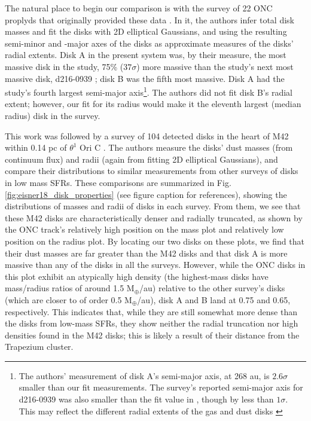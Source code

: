 The natural place to begin our comparison is with the survey of 22 ONC proplyds that originally provided these data \citep{Mann2014}. In it, the authors infer total disk masses and fit the disks with 2D elliptical Gaussians, and using the resulting semi-minor and -major axes of the disks as approximate measures of the disks' radial extents. Disk A in the present system was, by their measure, the most massive disk in the study, 75\% ($37\sigma$) more massive than the study's next most massive disk, d216-0939 \citep[the subject of][]{Factor2017} ; disk B was the fifth most massive. Disk A had the study's fourth largest semi-major axis\footnote{The authors' measurement of disk A's semi-major axis, at 268 au, is $2.6\sigma$ smaller than our fit measurements. The survey's reported semi-major axis for d216-0939 was also smaller than the fit value in \citet{Factor2017}, though by less than $1\sigma$. This may reflect the different radial extents of the gas and dust disks \citep[see][]{Hughes2008}}. The authors did not fit disk B's radial extent; however, our fit for its radius would make it the eleventh largest (median radius) disk in the survey.



This work was followed by a survey of 104 detected disks in the heart of M42 within 0.14 pc of $\theta^1$ Ori C \citep{Eisner2018}. The authors measure the disks' dust masses (from continuum flux) and radii (again from fitting 2D elliptical Gaussians), and compare their distributions to similar measurements from other surveys of disks in low mass SFRs. These comparisons are summarized in Fig. \ref{fig:eisner18_disk_properties} (see figure caption for references), showing the distributions of masses and radii of disks in each survey. From them, we see that these M42 disks are characteristically denser and radially truncated, as shown by the ONC track's relatively high position on the mass plot and relatively low position on the radius plot. By locating our two disks on these plots, we find that their dust masses are far greater than the M42 disks and that disk A is more massive than any of the disks in all the surveys. However, while the ONC disks in this plot exhibit an atypically high density (the highest-mass disks have mass/radius ratios of around 1.5 M$_\oplus$/au) relative to the other survey's disks (which are closer to of order 0.5 M$_\oplus$/au), disk A and B land at 0.75 and 0.65, respectively. This indicates that, while they are still somewhat more dense than the disks from low-mass SFRs, they show neither the radial truncation nor high densities found in the M42 disks; this is likely a result of their distance from the Trapezium cluster.

